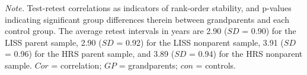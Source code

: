 \documentclass[
  english,
  man, noextraspace,floatsintext]{apa7}
\newenvironment{lltable}{\begin{landscape}\begin{center}\begin{ThreePartTable}}{\end{ThreePartTable}\end{center}\end{landscape}}
\begin{document}
\begin{appendix}
\begin{lltable}
{}

\end{lltable}













\begin{lltable}

\begin{TableNotes}[para]
\normalsize{\textit{Note.} Test-retest correlations as indicators of
rank-order stability, and p-values indicating significant group
differences therein between grandparents and each control group. The
average retest intervals in years are 2.90 (\(SD\) = 0.90) for the LISS
parent sample, 2.90 (\(SD\) = 0.92) for the LISS nonparent sample, 3.91
(\(SD\) = 0.96) for the HRS parent sample, and 3.89 (\(SD\) = 0.94) for
the HRS nonparent sample. \(Cor\) = correlation; \(GP\) = grandparents;
\(con\) = controls.}
\end{TableNotes}

\small{

}
\end{lltable}
\end{appendix}
\end{document}
